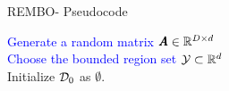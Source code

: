 
\begin{frame}[c]{REMBO- Pseudocode}


\begin{algorithm}[H]
    \LinesNumbered
    \SetAlgoLined
    \setcounter{AlgoLine}{0}
    
    \textcolor{blue}{Generate a random matrix $\pmb{A} \in \mathbb{R}^{D\times d}$}\\
    \textcolor{blue}{Choose the bounded region set $\mathcal{Y}\subset\mathbb{R}^d$}\\
    Initialize $\mathcal{D}_{0}$ as $\emptyset$.\\
    
    \caption{REMBO: Bayesian Optimization with Random Embedding. Blue text denotes parts that are changed compared to standard Bayesian Optimization.}
\end{algorithm}
\end{frame}
